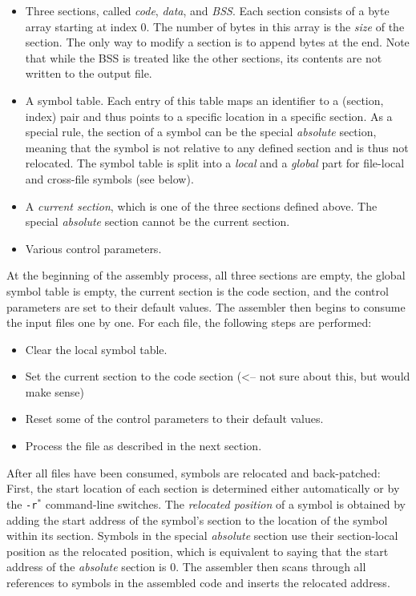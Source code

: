 \begin{itemize}
\item Three sections, called {\it code}, {\it data}, and {\it BSS}. Each section consists of a byte array starting at index 0. The number of bytes in this array is the {\it size} of the section. The only way to modify a section is to append bytes at the end. Note that while the BSS is treated like the other sections, its contents are not written to the output file.
\item A symbol table. Each entry of this table maps an identifier to a (section, index) pair and thus points to a specific location in a specific section. As a special rule, the section of a symbol can be the special {\it absolute} section, meaning that the symbol is not relative to any defined section and is thus not relocated. The symbol table is split into a {\it local} and a {\it global} part for file-local and cross-file symbols (see below).
\item A {\it current section}, which is one of the three sections defined above. The special {\it absolute} section cannot be the current section.
\item Various control parameters.
\end{itemize}

At the beginning of the assembly process, all three sections are empty, the global symbol table is empty, the current section is the code section, and the control parameters are set to their default values. The assembler then begins to consume the input files one by one. For each file, the following steps are performed:
\begin{itemize}
\item Clear the local symbol table.
\item Set the current section to the code section (<-- not sure about this, but would make sense)
\item Reset some of the control parameters to their default values.
\item Process the file as described in the next section.
\end{itemize}

After all files have been consumed, symbols are relocated and back-patched: First, the start location of each section is determined either automatically or by the {\tt -r}$^*$ command-line switches. The {\it relocated position} of a symbol is obtained by adding the start address of the symbol's section to the location of the symbol within its section. Symbols in the special {\it absolute} section use their section-local position as the relocated position, which is equivalent to saying that the start address of the {\it absolute} section is 0. The assembler then scans through all references to symbols in the assembled code and inserts the relocated address.

